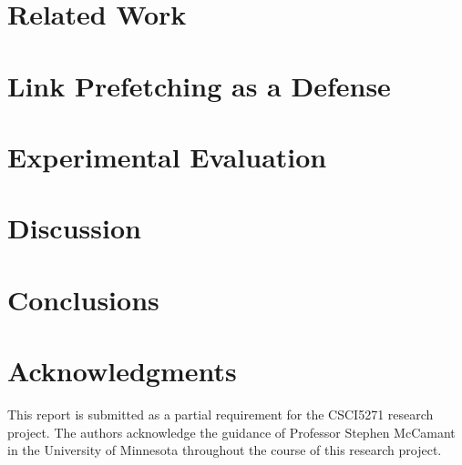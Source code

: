 \documentclass{sig-alternate-05-2015}
\begin{document}
\section{Related Work}


\section{Link Prefetching as a Defense}


\section{Experimental Evaluation}


\section{Discussion}


\section{Conclusions}



\section{Acknowledgments}
This report is submitted as a partial requirement for the CSCI5271 research project.
The authors acknowledge the guidance of Professor Stephen McCamant in the University of Minnesota throughout the course of this research project.



\end{document}
